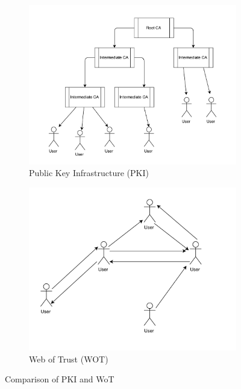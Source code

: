 \begin{figure}
	\centering
	\begin{subfigure}{.5\textwidth}
		\centering
		\includegraphics[width=1\linewidth]{figures/PKI}
		\caption{ Public Key Infrastructure (PKI)}
		\label{fig:pki}
	\end{subfigure}%
	\begin{subfigure}{.5\textwidth}
		\centering
		\includegraphics[width=1\linewidth]{figures/WOT}
		\caption{ Web of Trust (WOT)}
		\label{fig:wot}
	\end{subfigure}
	\caption{Comparison of PKI and WoT}
	\label{fig:pkiwot}
\end{figure}


